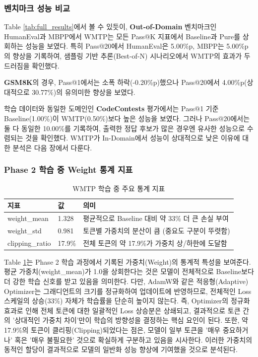 \documentclass[11pt,a4paper]{article}
\begin{document}
\subsubsection{벤치마크 성능 비교}

Table \ref{tab:full_results}에서 볼 수 있듯이, \textbf{Out-of-Domain} 벤치마크인 HumanEval과 MBPP에서 WMTP는 모든 Pass@K 지표에서 Baseline과 Pure를 상회하는 성능을 보였다. 특히 Pass@20에서 HumanEval은 5.00\%p, MBPP는 5.00\%p의 향상을 기록하여, 샘플링 기반 추론(Best-of-N) 시나리오에서 WMTP의 효과가 두드러짐을 확인했다.

\textbf{GSM8K}의 경우, Pass@1에서는 소폭 하락(-0.20\%p)했으나 Pass@20에서 4.00\%p(상대적으로 30.77\%)의 유의미한 향상을 보였다.

학습 데이터와 동일한 도메인인 \textbf{CodeContests} 평가에서는 Pass@1 기준 Baseline(1.00\%)이 WMTP(0.50\%)보다 높은 성능을 보였다. 그러나 Pass@20에서는 둘 다 동일한 10.00\%를 기록하여, 출력한 정답 후보가 많은 경우엔 유사한 성능으로 수렴되는 것을 확인했다. WMTP가 In-Domain에서 성능이 상대적으로 낮은 이유에 대한 분석은 다음 장에서 다룬다.

\subsubsection{Phase 2 학습 중 Weight 통계 지표}

\begin{table}[h]
    \centering
    \caption{WMTP 학습 중 주요 통계 지표}
    \label{tab:weight_stats}
    \begin{tabular}{@{}p{3cm}p{2cm}p{8cm}@{}}
    \toprule
    \textbf{지표} & \textbf{값} & \textbf{의미} \\
    \midrule
    weight\_mean & 1.328 & 평균적으로 Baseline 대비 약 33\% 더 큰 손실 부여 \\
    weight\_std & 0.981 & 토큰별 가중치의 분산이 큼 (중요도 구분이 뚜렷함) \\
    clipping\_ratio & 17.9\% & 전체 토큰의 약 17.9\%가 가중치 상/하한에 도달함 \\
    \bottomrule
    \end{tabular}
    \end{table}

Table \ref{tab:weight_stats}는 Phase 2 학습 과정에서 기록된 가중치(Weight)의 통계적 특성을 보여준다. 평균 가중치(weight\_mean)가 1.0을 상회한다는 것은 모델이 전체적으로 Baseline보다 더 강한 학습 신호를 받고 있음을 의미한다. 다만, AdamW와 같은 적응형(Adaptive) Optimizer는 그래디언트의 크기를 정규화하여 업데이트에 반영하므로, 전체적인 Loss 스케일의 상승(33\%) 자체가 학습률을 단순히 높이지 않는다. 즉, Optimizer의 정규화 효과로 인해 전체 토큰에 대한 일괄적인 Loss 상승분은 상쇄되고, 결과적으로 토큰 간의 '상대적인 가중치 차이'만이 학습의 방향성을 결정하는 핵심 요인이 된다. 또한, 약 17.9\%의 토큰이 클리핑(Clipping)되었다는 점은, 모델이 일부 토큰을 '매우 중요하거나' 혹은 '매우 불필요한' 것으로 확실하게 구분하고 있음을 시사한다. 이러한 가중치의 동적인 할당이 결과적으로 모델의 일반화 성능 향상에 기여했을 것으로 분석된다.
\end{document}
